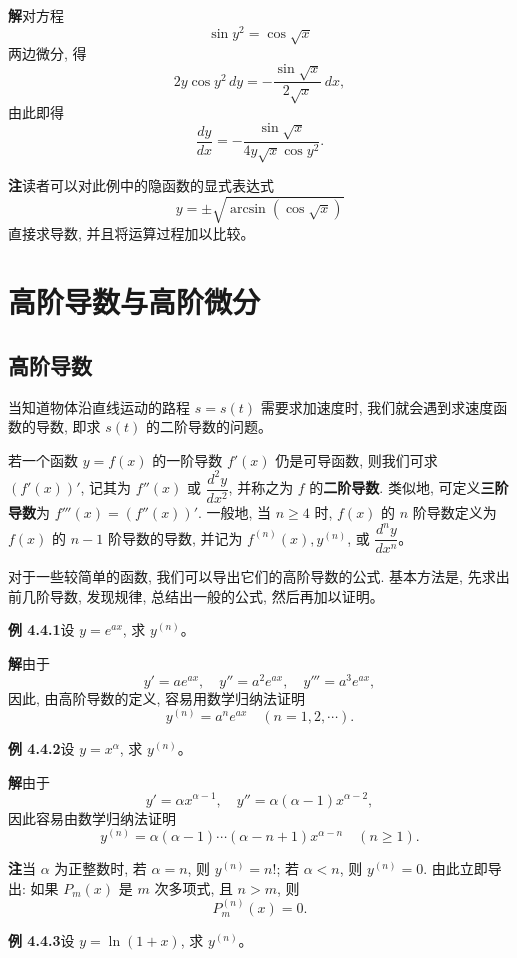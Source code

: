 \documentclass[UTF8, 12pt, fontset=fandol, oneside]{ctexart}
\begin{document}
\noindent\textbf{解}\quad 对方程
\[
  \sin y^2=\cos\sqrt{x}
\]
两边微分, 得
\[
  2y\cos y^2\,dy
  =
  -\frac{\sin\sqrt{x}}{2\sqrt{x}}\,dx,
\]
由此即得
\[
  \frac{dy}{dx}
  =
  -\frac{\sin\sqrt{x}}{4y\sqrt{x}\cos y^2}.
\]

\noindent\textbf{注}\quad 读者可以对此例中的隐函数的显式表达式
\[
  y=\pm\sqrt{\arcsin(\cos\sqrt{x})}
\]
直接求导数, 并且将运算过程加以比较。

\section{高阶导数与高阶微分}

\subsection{高阶导数}

当知道物体沿直线运动的路程 $s=s(t)$ 需要求加速度时, 我们就会遇到求速度函数的导数, 即求 $s(t)$ 的二阶导数的问题。

若一个函数 $y=f(x)$ 的一阶导数 $f'(x)$ 仍是可导函数, 则我们可求 $(f'(x))'$, 记其为 $f''(x)$ 或 $\dfrac{d^2y}{dx^2}$, 并称之为 $f$ 的\textbf{二阶导数}. 类似地, 可定义\textbf{三阶导数}为 $f'''(x)=(f''(x))'$. 一般地, 当 $n\geqslant4$ 时, $f(x)$ 的 $n$ 阶导数定义为 $f(x)$ 的 $n-1$ 阶导数的导数, 并记为 $f^{(n)}(x),y^{(n)}$, 或 $\dfrac{d^ny}{dx^n}$。

对于一些较简单的函数, 我们可以导出它们的高阶导数的公式. 基本方法是, 先求出前几阶导数, 发现规律, 总结出一般的公式, 然后再加以证明。

\noindent\textbf{例 4.4.1}\quad 设 $y=e^{ax}$, 求 $y^{(n)}$。

\noindent\textbf{解}\quad 由于
\[
  y'=ae^{ax},\quad y''=a^2e^{ax},\quad y'''=a^3e^{ax},
\]
因此, 由高阶导数的定义, 容易用数学归纳法证明
\[
  y^{(n)}=a^ne^{ax}\quad(n=1,2,\cdots).
\]

\noindent\textbf{例 4.4.2}\quad 设 $y=x^\alpha$, 求 $y^{(n)}$。

\noindent\textbf{解}\quad 由于
\[
  y'=\alpha x^{\alpha-1},\quad y''=\alpha(\alpha-1)x^{\alpha-2},
\]
因此容易由数学归纳法证明
\[
  y^{(n)}
  =
  \alpha(\alpha-1)\cdots(\alpha-n+1)x^{\alpha-n}
  \quad(n\geqslant1).
\]

\noindent\textbf{注}\quad 当 $\alpha$ 为正整数时, 若 $\alpha=n$, 则 $y^{(n)}=n!$; 若 $\alpha<n$, 则 $y^{(n)}=0$. 由此立即导出: 如果 $P_m(x)$ 是 $m$ 次多项式, 且 $n>m$, 则
\[
  P_m^{(n)}(x)=0.
\]

\noindent\textbf{例 4.4.3}\quad 设 $y=\ln(1+x)$, 求 $y^{(n)}$。
\end{document}
